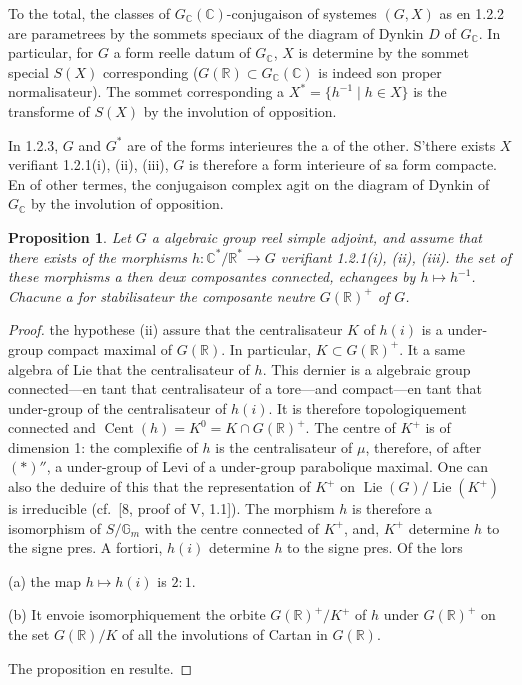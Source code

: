 \documentclass[12pt,a4paper]{article}
\theoremstyle{plain}
\newtheorem{proposition}[theorem]{Proposition}
\theoremstyle{definition}
\theoremstyle{remark}
\DeclareMathOperator{\Lie}{Lie}
\DeclareMathOperator{\Cent}{Cent}
\newcommand{\RR}{\mathbb{R}}
\newcommand{\CC}{\mathbb{C}}
\newcommand{\Gm}{\mathbb{G}}
\begin{document}
To the total, the classes of $G_{\CC}(\CC)$-conjugaison of systemes $(G,X)$ as en 1.2.2 are parametrees by the sommets speciaux of the diagram of Dynkin $D$ of $G_{\CC}$. In particular, for $G$ a form reelle datum of $G_{\CC}$, $X$ is determine by the sommet special $S(X)$ corresponding ($G(\RR) \subset G_{\CC}(\CC)$ is indeed son proper normalisateur). The sommet corresponding a $X^* = \{h^{-1} \mid h \in X\}$ is the transforme of $S(X)$ by the involution of opposition.

In 1.2.3, $G$ and $G^*$ are of the forms interieures the a of the other. S'there exists $X$ verifiant 1.2.1(i), (ii), (iii), $G$ is therefore a form interieure of sa form compacte. En of other termes, the conjugaison complex agit on the diagram of Dynkin of $G_{\CC}$ by the involution of opposition.

\begin{proposition}
Let $G$ a algebraic group reel simple adjoint, and assume that there exists of the morphisms $h:\CC^*/\RR^* \to G$ verifiant 1.2.1(i), (ii), (iii). the set of these morphisms a then deux composantes connected, echangees by $h \mapsto h^{-1}$. Chacune a for stabilisateur the composante neutre $G(\RR)^+$ of $G$.
\end{proposition}

\begin{proof}
the hypothese (ii) assure that the centralisateur $K$ of $h(i)$ is a under-group compact maximal of $G(\RR)$. In particular, $K \subset G(\RR)^+$. It a same algebra of Lie that the centralisateur of $h$. This dernier is a algebraic group connected---en tant that centralisateur of a tore---and compact---en tant that under-group of the centralisateur of $h(i)$. It is therefore topologiquement connected and $\Cent(h) = K^0 = K \cap G(\RR)^+$. The centre of $K^+$ is of dimension 1: the complexifie of $h$ is the centralisateur of $\mu$, therefore, of after $(*)''$, a under-group of Levi of a under-group parabolique maximal. One can also the deduire of this that the representation of $K^+$ on $\Lie(G)/\Lie(K^+)$ is irreducible (cf.~[8, proof of V, 1.1]). The morphism $h$ is therefore a isomorphism of $S/\Gm_m$ with the centre connected of $K^+$, and, $K^+$ determine $h$ to the signe pres. A fortiori, $h(i)$ determine $h$ to the signe pres. Of the lors

(a) the map $h \mapsto h(i)$ is $2:1$.

(b) It envoie isomorphiquement the orbite $G(\RR)^+/K^+$ of $h$ under $G(\RR)^+$ on the set $G(\RR)/K$ of all the involutions of Cartan in $G(\RR)$.

The proposition en resulte.
\end{proof}
\end{document}
